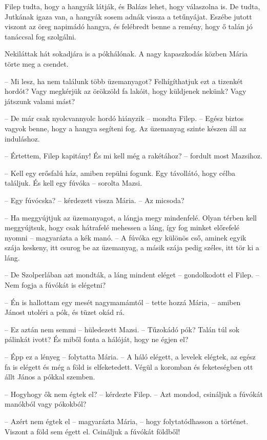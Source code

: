 \documentclass[10pt]{memoir}
\begin{document}
Filep tudta, hogy a hangyák látják, és Balázs lehet, hogy válaszolna is. De
tudta, Jutkának igaza van, a hangyák sosem adnák vissza a tetűnyájat. Eszébe
jutott viszont az öreg napimádó hangya, és felébredt benne a remény, hogy ő
talán jó tanáccsal fog szolgálni.

Nekiláttak hát sokadjára is a pókhálónak. A nagy kapaszkodás közben Mária törte
meg a csendet.

-- Mi lesz, ha nem találunk több üzemanyagot? Felhígíthatjuk ezt a tizenkét
hordót? Vagy megkérjük az örökzöld fa lakóit, hogy küldjenek nekünk? Vagy
játszunk valami mást?

-- De már csak nyolcvannyolc hordó hiányzik -- mondta Filep. -- Egész biztos
vagyok benne, hogy a hangya segíteni fog. Az üzemanyag szinte készen áll az
induláshoz.

-- Értettem, Filep kapitány! És mi kell még a rakétához? -- fordult most
Mazsihoz.

-- Kell egy erősfalú ház, amiben repülni fogunk. Egy távollátó, hogy célba
találjuk. És kell egy fúvóka -- sorolta Mazsi.

-- Egy fúvócska? -- kérdezett vissza Mária. -- Az micsoda?

-- Ha meggyújtjuk az üzemanyagot, a lángja megy mindenfelé. Olyan térben kell
meggyújtsuk, hogy csak hátrafelé mehessen a láng, így fog minket előrefelé
nyomni -- magyarázta a kék manó. -- A fúvóka egy különös cső, aminek egyik
szája keskeny, itt csurog be az üzemanyag, a másik szája pedig széles, itt tör
ki a láng.

-- De Szolperlában azt mondták, a láng mindent eléget -- gondolkodott el
Filep. -- Nem fogja a fúvókát is elégetni?

-- Én is hallottam egy mesét nagymamámtól -- tette hozzá Mária, -- amiben
Jánost utoléri a pók, és tüzet okád rá.

-- Ez aztán nem semmi -- hüledezett Mazsi. -- Tűzokádó pók? Talán túl sok
pálinkát ivott? És miből fonta a hálóját, hogy ne égjen el?

-- Épp ez a lényeg -- folytatta Mária. -- A háló elégett, a levelek elégtek,
az egész fa is elégett és még a föld is elfeketedett. Végül a koromban és
feketeségben ott állt János a pókkal szemben.

-- Hogyhogy ők nem égtek el? -- kérdezte Filep. -- Azt mondod, csináljuk a
fúvókát manókból vagy pókokból?

-- Azért nem égtek el -- magyarázta Mária, -- hogy folytatódhasson a
történet.  Viszont a föld sem égett el. Csináljuk a fúvókát földből!
\end{document}
